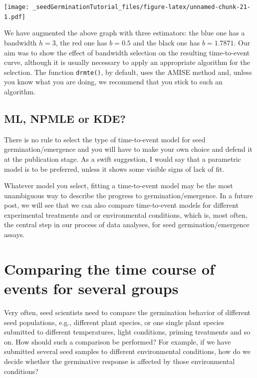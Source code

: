 \documentclass[
]{book}
\begin{document}
\texttt{[image: \_seedGerminationTutorial\_files/figure-latex/unnamed-chunk-21-1.pdf]}

We have augmented the above graph with three estimators: the blue one has a bandwidth \(h = 3\), the red one has \(b = 0.5\) and the black one has \(b = 1.7871\). Our aim was to show the effect of bandwidth selection on the resulting time-to-event curve, although it is usually necessary to apply an appropriate algorithm for the selection. The function \texttt{drmte()}, by default, uses the AMISE method and, unless you know what you are doing, we recommend that you stick to such an algorithm.

\hypertarget{ml-npmle-or-kde}{%
\section{ML, NPMLE or KDE?}\label{ml-npmle-or-kde}}

There is no rule to select the type of time-to-event model for seed germination/emergence and you will have to make your own choice and defend it at the publication stage. As a swift suggestion, I would say that a parametric model is to be preferred, unless it shows some visible signs of lack of fit.

Whatever model you select, fitting a time-to-event model may be the most unambiguous way to describe the progress to germination/emergence. In a future post, we will see that we can also compare time-to-event models for different experimental treatments and or environmental conditions, which is, most often, the central step in our process of data analyses, for seed germination/emergence assays.

\hypertarget{comparing-the-time-course-of-events-for-several-groups}{%
\chapter{Comparing the time course of events for several groups}\label{comparing-the-time-course-of-events-for-several-groups}}

Very often, seed scientists need to compare the germination behavior of different seed populations, e.g., different plant species, or one single plant species submitted to different temperatures, light conditions, priming treatments and so on. How should such a comparison be performed? For example, if we have submitted several seed samples to different environmental conditions, how do we decide whether the germinative response is affected by those environmental conditions?
\end{document}
